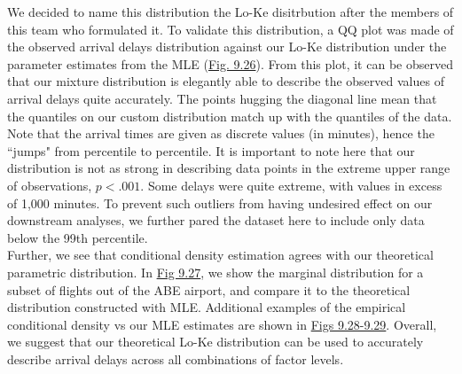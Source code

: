 \documentclass[12pt, a4paper, openany]{book}
\newcommand\tab[1][1cm]{\hspace*{#1}}
\begin{document}
	\tab We decided to name this distribution the Lo-Ke disitrbution after the members of this team who formulated it. To validate this distribution, a QQ plot was made of the observed arrival delays distribution against our Lo-Ke distribution under the parameter estimates from the MLE (\underline{Fig. 9.26}). From this plot, it can be observed that our mixture distribution is elegantly able to describe the observed values of arrival delays quite accurately. The points hugging the diagonal line mean that the quantiles on our custom distribution match up with the quantiles of the data. Note that the arrival times are given as discrete values (in minutes), hence the “jumps" from percentile to percentile. It is important to note here that our distribution is not as strong in describing data points in the extreme upper range of observations, $p<.001$. Some delays were quite extreme, with values in excess of 1,000 minutes. To prevent such outliers from having undesired effect on our downstream analyses, we further pared the dataset here to include only data below the 99th percentile.  \\

	\tab Further, we see that conditional density estimation agrees with our theoretical parametric distribution. In \underline{Fig 9.27}, we show the marginal distribution for a subset of flights out of the ABE airport, and compare it to the theoretical distribution constructed with MLE. Additional examples of the empirical conditional density vs our MLE estimates are shown in \underline{Figs 9.28-9.29}. Overall, we suggest that our theoretical Lo-Ke distribution can be used to accurately describe arrival delays across all combinations of factor levels. \\

\end{document}
